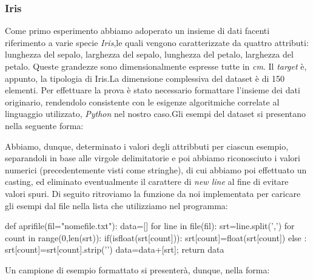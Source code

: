 		\subsubsection{Iris}
			Come primo esperimento abbiamo adoperato un insieme di dati facenti riferimento a varie specie \emph{Iris},le quali vengono caratterizzate da quattro attributi: lunghezza del sepalo, larghezza del sepalo, lunghezza del petalo, larghezza del petalo. Queste grandezze sono dimensionalmente espresse tutte in \emph{cm}. Il \emph{target} è, appunto, la tipologia di Iris.\newline La dimensione complessiva del dataset è di 150 elementi. Per effettuare la prova è stato necessario formattare l'insieme dei dati originario, rendendolo consistente con le esigenze algoritmiche correlate al linguaggio utilizzato, \emph{Python} nel nostro caso.\newline Gli esempi del dataset si presentano nella seguente forma:
			
			Abbiamo, dunque, determinato i valori degli attribbuti per ciascun esempio,	
			separandoli in base alle virgole delimitatorie e poi abbiamo riconosciuto i valori numerici (precedentemente visti come stringhe), di cui abbiamo poi effettuato un casting,
			ed eliminato eventualmente il carattere di \textit{new line} al fine di evitare valori spuri.
			Di seguito ritroviamo la funzione da noi implementata per caricare gli esempi dal file nella lista che utilizziamo nel programma:
			\medskip
			\begin{python}
		def aprifile(fil="nomefile.txt"):
			data=[]
			for line in file(fil):
				srt=line.split(',')
				for count in range(0,len(srt)):
					if(isfloat(srt[count])):
						srt[count]=float(srt[count])
					else :
						srt[count]=srt[count].strip('\n')
				data=data+[srt];
			return data
			\end{python}
			\bigskip
			Un campione di esempio formattato si presenterà, dunque, nella forma:
			
		
